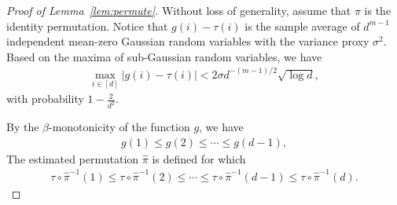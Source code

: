 \documentclass[12pt]{article}
\theoremstyle{definition}
\begin{document}
\begin{proof}[Proof of Lemma~\ref{lem:permute}]
Without loss of generality, assume that $\pi$ is the identity permutation. 
Notice that $g(i)-\tau(i)$ is the sample average of $d^{m-1}$ independent mean-zero Gaussian random variables with the variance proxy $\sigma^2$. Based on the maxima of sub-Gaussian random variables, we have
\begin{align}\label{eq:concentration}
   \max_{i\in[d]} |g(i)-\tau(i)| < 2\sigma d^{-(m-1)/2}\sqrt{\log d},
\end{align}
with probability $1-\frac{2}{d^2}$. 

By the $\beta$-monotonicity of the function $g$, we have
\begin{align}\label{eq:mon1}
    g(1)\leq g(2)  \leq \cdots \leq g(d-1),
\end{align}
The estimated permutation $\hat\pi$ is defined for which
\begin{align}\label{eq:mon2}
    \tau \circ \hat\pi^{-1}(1) \leq\tau \circ \hat\pi^{-1}(2) \leq \cdots\leq \tau \circ \hat\pi^{-1}(d-1) \leq \tau \circ \hat\pi^{-1}(d).
\end{align}


\end{proof}
\end{document}
